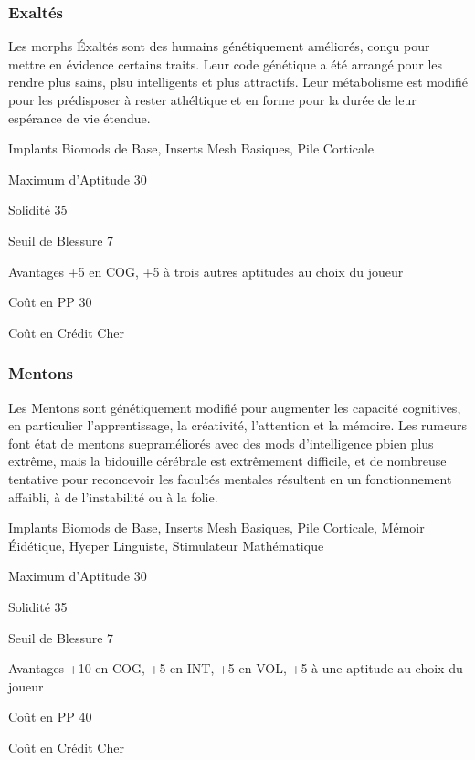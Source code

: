 \subsubsection{Exaltés} \label{sec:starting-exalts} 

Les morphs Éxaltés sont des humains génétiquement améliorés, conçu pour mettre en évidence certains traits. Leur code génétique a été arrangé pour les rendre plus sains, plsu intelligents et plus attractifs. Leur métabolisme est modifié pour les prédisposer à rester athéltique et en forme pour la durée de leur espérance de vie étendue. 

\begin{description*} \item[Implants] Biomods de Base, Inserts Mesh Basiques, Pile Corticale\item[Maximum d'Aptitude] 30 \item[Solidité] 35 \item[Seuil de Blessure] 7 \item[Avantages] +5 en COG, +5 à trois autres aptitudes au choix du joueur\item[Coût en PP] 30 \item[Coût en Crédit] Cher \end{description*} 

\subsubsection{Mentons} \label{sec:starting-mentons} 

Les Mentons sont génétiquement modifié pour augmenter les capacité cognitives, en particulier l'apprentissage, la créativité, l'attention et la mémoire. Les rumeurs font état de mentons suepraméliorés avec des mods d'intelligence pbien plus extrême, mais la bidouille cérébrale est extrêmement difficile, et de nombreuse tentative pour reconcevoir les facultés mentales résultent en un fonctionnement affaibli, à de l'instabilité ou à la folie. 

\begin{description*} 
   \item[Implants] Biomods de Base, Inserts Mesh Basiques, Pile Corticale, Mémoir Éidétique, Hyeper Linguiste, Stimulateur Mathématique
   \item[Maximum d'Aptitude] 30
   \item[Solidité] 35
   \item[Seuil de Blessure] 7
   \item[Avantages] +10 en COG, +5 en INT, +5 en VOL, +5 à une aptitude au choix du joueur\item[Coût en PP] 40
   \item[Coût en Crédit] Cher
\end{description*} 


